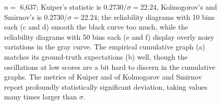 \documentclass{article}
\begin{document}
\begin{figure}
\begin{centering}
\end{centering}
\caption{$n =$ 6,637; Kuiper's statistic is $0.2730 / \sigma = 22.24$,
         Kolmogorov's and Smirnov's is $0.2730 / \sigma = 22.24$;
         the reliability diagrams with 10 bins each (c and d) smooth
         the black curve too much, while the reliability diagrams
         with 50 bins each (e and f) display overly noisy variations
         in the gray curve. The empirical cumulative graph (a) matches
         its ground-truth expectations (b) well, though the oscillations
         at low scores are a bit hard to discern in the cumulative graphs.
         The metrics of Kuiper and of Kolmogorov and Smirnov
         report profoundly statistically significant deviation,
         taking values many times larger than $\sigma$.
}
\label{ex2}
\end{figure}
\end{document}
